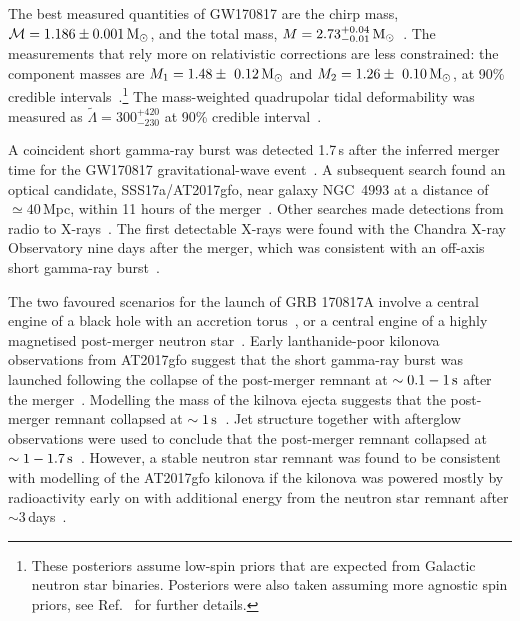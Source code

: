 \documentclass[../Thesis.tex]{subfiles}
\begin{document}
    \par
    The best measured quantities of GW170817 are the chirp mass, $\mathcal{M}=1.186\pm 0.001\,\mathrm{M}_{\odot}$, and the total mass, $M=2.73^{+0.04}_{-0.01}\,\mathrm{M}_{\odot}$~\cite{GW170817Properties}.
    The measurements that rely more on relativistic corrections are less constrained: the component masses are $M_1 = 1.48\pm~0.12\,\mathrm{M}_{\odot}$ and $M_2=1.26\pm~0.10\,\mathrm{M}_{\odot}$, at 90\% credible intervals~\cite{GW170817Properties}.\footnote{These posteriors assume low-spin priors that are expected from Galactic neutron star binaries. Posteriors were also taken assuming more agnostic spin priors, see Ref.~\cite{GW170817Properties} for further details.}
    The mass-weighted quadrupolar tidal deformability was measured as $\tilde{\Lambda}=300^{+420}_{-230}$ at 90\% credible interval~\cite{GW170817Properties}.\par
  
    A coincident short gamma-ray burst was detected 1.7\,s after the inferred merger time for the GW170817 gravitational-wave event~\cite{Goldstein2017,GW170817Detection}. 
    A subsequent search found an optical candidate, SSS17a/AT2017gfo, near galaxy NGC~4993 at a distance of $\simeq 40\,$Mpc, within 11 hours of the merger~\cite{Coulter2017}.
    Other searches made detections from radio to X-rays~\cite[e.g.,][]{Troja2017,Nicholl2017,Chornock2017,Margutti2017,Alexander2017}.
    The first detectable X-rays were found with the Chandra X-ray Observatory nine days after the merger, which was consistent with an off-axis short gamma-ray burst~\cite{Troja2017}. \par
    

    The two favoured scenarios for the launch of GRB 170817A involve a central engine of a black hole with an accretion torus~\cite[e.g.,][]{Metzger2018,Gill2019,Murguia-Berthier2021}, or a central engine of a highly magnetised post-merger neutron star~\cite[e.g.,][]{Yu2018}.
    Early lanthanide-poor kilonova observations from AT2017gfo suggest that the short gamma-ray burst was launched following the collapse of the post-merger remnant at $\sim 0.1-1\,\mathrm{s}$ after the merger~\cite{Metzger2018}.
    Modelling the mass of the kilnova ejecta suggests that the post-merger remnant collapsed at $\sim 1\,\mathrm{s}$~\cite{Gill2019}.
    Jet structure together with afterglow observations were used to conclude that the post-merger remnant collapsed at $\sim 1-1.7\,\mathrm{s}$~\cite{Murguia-Berthier2021}.
    However, a stable neutron star remnant was found to be consistent with modelling of the AT2017gfo kilonova if the kilonova was powered mostly by radioactivity early on with additional energy from the neutron star remnant after $\sim 3\,$days~\cite{Yu2018}. \par
    
\end{document}
